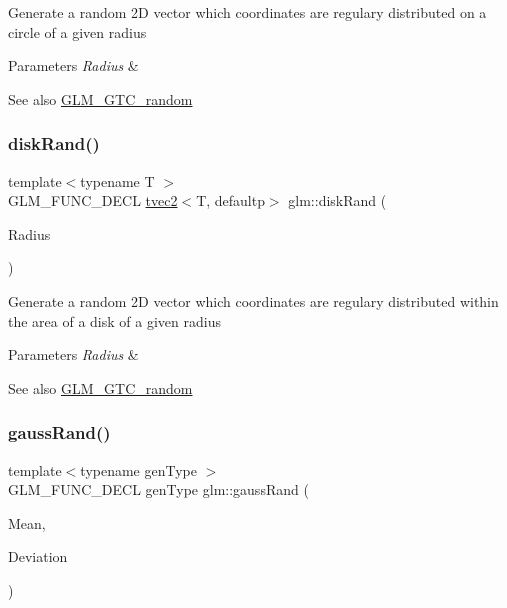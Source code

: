 Generate a random 2D vector which coordinates are regulary distributed on a circle of a given radius


\begin{DoxyParams}{Parameters}
{\em Radius} & \\
\hline
\end{DoxyParams}
\begin{DoxySeeAlso}{See also}
\hyperlink{group__gtc__random}{G\+L\+M\+\_\+\+G\+T\+C\+\_\+random} 
\end{DoxySeeAlso}
\mbox{\label{group__gtc__random_gad3a3ee7d26502a31ba552cb627a68606}} 
\subsubsection{\texorpdfstring{disk\+Rand()}{diskRand()}}
{\footnotesize\ttfamily template$<$typename T $>$ \\
G\+L\+M\+\_\+\+F\+U\+N\+C\+\_\+\+D\+E\+CL \hyperlink{structglm_1_1tvec2}{tvec2}$<$T, defaultp$>$ glm\+::disk\+Rand (\begin{DoxyParamCaption}\item[{T}]{Radius }\end{DoxyParamCaption})}

Generate a random 2D vector which coordinates are regulary distributed within the area of a disk of a given radius


\begin{DoxyParams}{Parameters}
{\em Radius} & \\
\hline
\end{DoxyParams}
\begin{DoxySeeAlso}{See also}
\hyperlink{group__gtc__random}{G\+L\+M\+\_\+\+G\+T\+C\+\_\+random} 
\end{DoxySeeAlso}
\mbox{\label{group__gtc__random_ga5193a83e49e4fdc5652c084711083574}} 
\subsubsection{\texorpdfstring{gauss\+Rand()}{gaussRand()}}
{\footnotesize\ttfamily template$<$typename gen\+Type $>$ \\
G\+L\+M\+\_\+\+F\+U\+N\+C\+\_\+\+D\+E\+CL gen\+Type glm\+::gauss\+Rand (\begin{DoxyParamCaption}\item[{gen\+Type}]{Mean,  }\item[{gen\+Type}]{Deviation }\end{DoxyParamCaption})}

